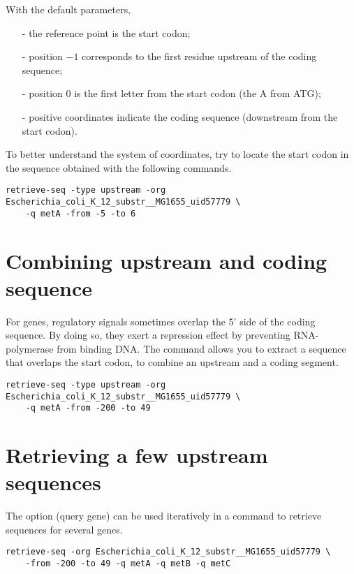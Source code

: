 \begin{samepage}
With the default parameters, 
\begin{itemize}
\item[-] the reference point is the start codon;
\item[-] position $-1$ corresponds to the first residue upstream of
  the coding sequence; 
\item[-] position 0 is the first letter from the start codon (the A from
  ATG);
\item[-] positive coordinates indicate the coding sequence (downstream
  from the start codon).
\end{itemize}
\end{samepage}

To better understand the system of coordinates, try to locate the
start codon in the sequence obtained with the following commands.

\begin{lstlisting}
retrieve-seq -type upstream -org Escherichia_coli_K_12_substr__MG1655_uid57779 \
    -q metA -from -5 -to 6
\end{lstlisting}


\section{Combining upstream and coding sequence}

For  genes, regulatory signals sometimes overlap the 5'
side of the coding sequence. By doing so, they exert a repression
effect by preventing RNA-polymerase from binding DNA. The command
\program{retrieve-seq} allows you to extract a sequence that overlaps
the start codon, to combine an upstream and a coding segment.

\begin{lstlisting}
retrieve-seq -type upstream -org Escherichia_coli_K_12_substr__MG1655_uid57779 \
    -q metA -from -200 -to 49
\end{lstlisting}

\section{Retrieving a few upstream sequences}

The option  (query gene) can be used iteratively in a
command to retrieve sequences for several genes.

\begin{lstlisting}
retrieve-seq -org Escherichia_coli_K_12_substr__MG1655_uid57779 \
    -from -200 -to 49 -q metA -q metB -q metC
\end{lstlisting}

